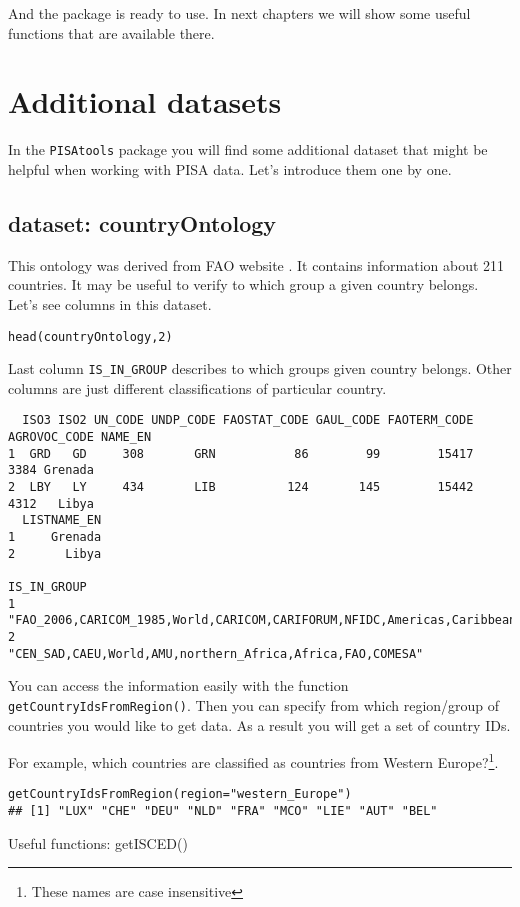 And the package is ready to use.
In next chapters we will show some useful functions that are available there.

\section*{Additional datasets}

In the \verb:PISAtools: package you will find some additional dataset that might be helpful when working with PISA data. Let's introduce them one by one.

\subsection*{dataset: countryOntology}
This ontology was derived from FAO website \cite{FAOwebsite}. It contains information about 211 countries. It may be useful to verify to which group a given country belongs. Let's see columns in this dataset.

\begin{shaded}\begin{verbatim}
head(countryOntology,2)
\end{verbatim}\end{shaded}

Last column \verb:IS_IN_GROUP: describes to which groups given country belongs. Other columns are just different classifications of particular country. 

\begin{shaded}\begin{verbatim}
  ISO3 ISO2 UN_CODE UNDP_CODE FAOSTAT_CODE GAUL_CODE FAOTERM_CODE AGROVOC_CODE NAME_EN
1  GRD   GD     308       GRN           86        99        15417         3384 Grenada
2  LBY   LY     434       LIB          124       145        15442         4312   Libya
  LISTNAME_EN
1     Grenada
2       Libya
                                                                        IS_IN_GROUP
1 "FAO_2006,CARICOM_1985,World,CARICOM,CARIFORUM,NFIDC,Americas,Caribbean,FAO,SIDS"
2                        "CEN_SAD,CAEU,World,AMU,northern_Africa,Africa,FAO,COMESA"
\end{verbatim}\end{shaded}

You can access the information easily with the function \verb:getCountryIdsFromRegion():. Then you can specify from which region/group of countries you would like to get data. As a result you will get a set of country IDs.

For example, which countries are classified as countries from Western Europe?\footnote{These names are case insensitive}.

\begin{shaded}\begin{verbatim}
getCountryIdsFromRegion(region="western_Europe")
## [1] "LUX" "CHE" "DEU" "NLD" "FRA" "MCO" "LIE" "AUT" "BEL"
\end{verbatim}\end{shaded}


Useful functions: getISCED()
